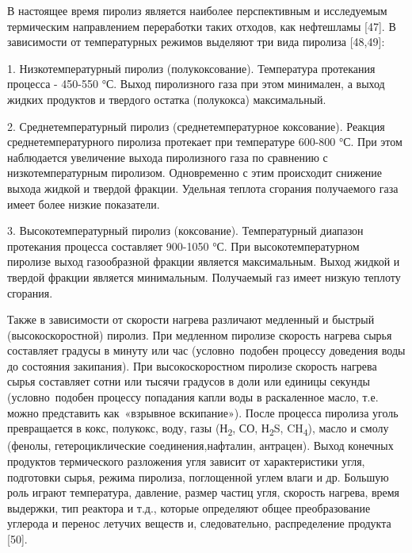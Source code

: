 В настоящее время пиролиз является наиболее перспективным и исследуемым
термическим направлением переработки таких отходов, как нефтешламы
{[}47{]}. В зависимости от температурных режимов выделяют три вида
пиролиза {[}48,49{]}:

1. Низкотемпературный пиролиз (полукоксование). Температура протекания
процесса - 450-550 °С. Выход пиролизного газа при этом минимален, а
выход жидких продуктов и твердого остатка (полукокса) максимальный.

2. Среднетемпературный пиролиз (среднетемпе­ратурное коксование). Реакция
среднетемпературного пиролиза протекает при температуре 600-800 °С. При
этом наблюдается увеличение выхода пиролизного газа по сравнению с
низкотемпературным пиролизом. Одновременно с этим происходит снижение
выхода жид­кой и твердой фракции. Удельная теплота сгорания получаемого
газа имеет более низкие показатели.

3. Высокотемпературный пиролиз (коксование). Температурный диапазон
протекания процесса состав­ляет 900-1050 °С. При высокотемпературном
пиролизе выход газообразной фракции является максимальным. Выход жидкой
и твердой фракции является минималь­ным. Получаемый газ имеет низкую
теплоту сгорания.

Также в зависимости от скорости нагрева различают медленный и быстрый
(высокоскоростной) пиролиз. При медленном пиролизе скорость нагрева
сырья составляет градусы в минуту или час (условно~подобен процессу
доведения воды до состояния закипания). При высокоскоростном пиролизе
скорость нагрева сырья составляет сотни или тысячи градусов в доли или
единицы секунды (условно~подобен процессу попадания капли воды в
раскаленное масло, т.е. можно представить как~«взрывное вскипание»).
После процесса пиролиза уголь превращается в кокс, полукокс, воду, газы
(Н\textsubscript{2}, СО, Н\textsubscript{2}S, CH\textsubscript{4}),
масло и смолу (фенолы, гетероциклические соединения,нафталин, антрацен).
Выход конечных продуктов термического разложения угля зависит от
характеристики угля, подготовки сырья, режима пиролиза, поглощенной
углем влаги и др. Большую роль играют температура, давление, размер
частиц угля, скорость нагрева, время выдержки, тип реактора и т.д.,
которые определяют общее преобразование углерода и перенос летучих
веществ и, следовательно, распределение продукта {[}50{]}.

